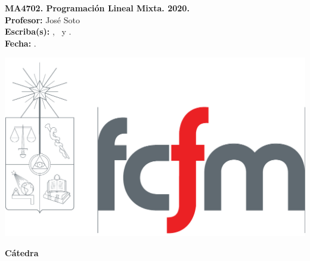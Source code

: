 
\vspace*{-1.2 cm}
\begin{minipage}{0.6\textwidth}
\begin{flushleft}
\hspace*{-0.5cm}\textbf{MA4702. Programación Lineal Mixta. 2020.}\\
\hspace*{-0.5cm}\textbf{Profesor:} José Soto\\
\hspace*{-0.5cm}\textbf{Escriba(s):} \sca, \scb ~y \scc.\\
\hspace*{-0.5cm}\textbf{Fecha:} \fecha.
\end{flushleft}
\end{minipage}
\begin{minipage}{0.36\textwidth}
\begin{flushright}
\includegraphics[scale=0.15]{fcfm}
\end{flushright}
\end{minipage}
\bigskip

\begin{center}
\LARGE\textbf{Cátedra \catnum}
\end{center}


